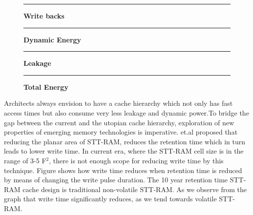 \begin{figure*} [t]
\centering
 \hrule
 \caption{\label{fig:cdf} \scriptsize \bf Write backs}
\end{figure*}

\begin{figure*} [t]
\centering
 \hrule
 \caption{\label{fig:dyn} \scriptsize \bf Dynamic Energy}
\end{figure*}

\begin{figure*} [t]
\centering
 \hrule
 \caption{\label{fig:leak} \scriptsize \bf Leakage }
\end{figure*}

\begin{figure*} [t]
\centering
 \hrule
 \caption{\label{fig:tot} \scriptsize \bf Total Energy}
\end{figure*}





Architects always envision to have a cache hierarchy which not only has fast access times but also consume very less leakage and dynamic power.To bridge the gap between the current and the utopian cache hierarchy,  exploration of new properties of emerging memory technologies is imperative. \cite{sudhanva} et.al proposed that reducing the planar area of STT-RAM, reduces the retention time which in turn leads to lower write time.  In current era, where the STT-RAM cell size is in the range of 3-5 F$^2$, there is not enough scope for reducing write time by this technique. Figure %
shows how write time reduces when retention time is reduced by means of changing the write pulse duration. The 10 year retention time STT-RAM cache design is traditional non-volatile STT-RAM. As we observe from the graph that write time significantly reduces, as we tend towards volatile STT-RAM.  %

